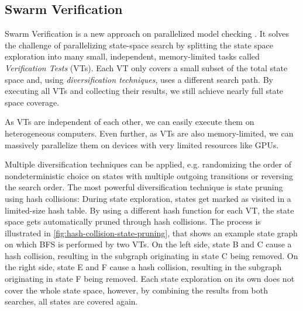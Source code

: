 \documentclass[
fancyheadings, %
%
%
]{stsreprt}
\begin{document}
\subsection{Swarm Verification}
\label{section:background:swarm-verification}

Swarm Verification is a new approach on parallelized model checking \cite{Holzmann2008.Swarm-Verification}.
It solves the challenge of parallelizing state-space search by splitting the state space exploration into many small, independent, memory-limited tasks called \emph{Verification Tests} (VTs).
Each VT only covers a small subset of the total state space and, using \emph{diversification techniques}, uses a different search path.
By executing all VTs and collecting their results, we still achieve nearly full state space coverage.


As VTs are independent of each other, we can easily execute them on heterogeneous computers.
Even further, as VTs are also memory-limited, we can massively parallelize them on devices with very limited resources like GPUs.

Multiple diversification techniques can be applied, e.g. randomizing the order of nondeterministic choice on states with multiple outgoing transitions or reversing the search order.
The most powerful diversification technique is state pruning using hash collisions:
During state exploration, states get marked as visited in a limited-size hash table.
By using a different hash function for each VT, the state space gets automatically pruned through hash collisions.
The process is illustrated in \cref{fig:hash-collision-state-pruning}, that shows an example state graph on which BFS is performed by two VTs.
On the left side, state B and C cause a hash collision, resulting in the subgraph originating in state C being removed.
On the right side, state E and F cause a hash collision, resulting in the subgraph originating in state F being removed.
Each state exploration on its own does not cover the whole state space, however, by combining the results from both searches, all states are covered again.
\end{document}

